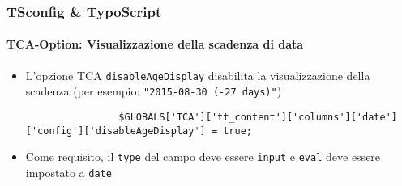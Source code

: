 \begin{frame}[fragile]
	\frametitle{TSconfig \& TypoScript}
	\framesubtitle{TCA-Option: Visualizzazione della scadenza di data}

	\lstset{basicstyle=\tiny\ttfamily}

	\begin{itemize}

		\item L'opzione TCA \texttt{disableAgeDisplay} disabilita la visualizzazione della scadenza\newline
			\small
				(per esempio: \texttt{"2015-08-30 (-27 days)"})
			\normalsize

			\begin{lstlisting}
				$GLOBALS['TCA']['tt_content']['columns']['date']['config']['disableAgeDisplay'] = true;
			\end{lstlisting}

		\item Come requisito, il \texttt{type} del campo deve essere \texttt{input}
			e \texttt{eval} deve essere impostato a \texttt{date}

	\end{itemize}

\end{frame}

